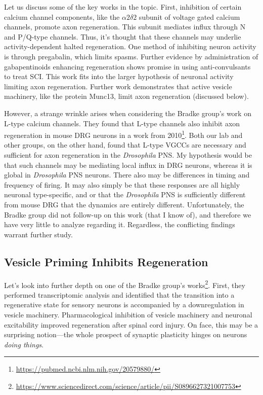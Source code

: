 Let us discuss some of the key works in the topic. First, inhibition of certain calcium channel components, like the $\alpha2\delta2$ subunit of voltage gated calcium channels, promote axon regeneration. This subunit mediates influx through N and P/Q-type channels. Thus, it's thought that these channels may underlie activity-dependent halted regeneration. One method of inhibiting neuron activity is through pregabalin, which limits spasms. Further evidence by administration of gabapentinoids enhancing regeneration shows promise in using anti-convulsants to treat SCI. This work fits into the larger hypothesis of neuronal activity limiting axon regeneration. Further work demonstrates that active vesicle machinery, like the protein Munc13, limit axon regeneration (discussed below).\newline

However, a strange wrinkle arises when considering the Bradke group's work on L-type calcium channels. They found that L-type channels also inhibit axon regeneration in mouse DRG neurons in a work from 2010\footnote{\url{https://pubmed.ncbi.nlm.nih.gov/20579880/}}. Both our lab and other groups, on the other hand, found that L-type VGCCs are necessary and sufficient for axon regeneration in the \textit{Drosophila} PNS. My hypothesis would be that such channels may be mediating local influx in DRG neurons, whereas it is global in \textit{Drosophila} PNS neurons. There also may be differences in timing and frequency of firing. It may also simply be that these responses are all highly neuronal type-specific, and or that the \textit{Drosophila} PNS is sufficiently different from mouse DRG that the dynamics are entirely different. Unfortunately, the Bradke group did not follow-up on this work (that I know of), and therefore we have very little to analyze regarding it. Regardless, the conflicting findings warrant further study.


\subsection{Vesicle Priming Inhibits Regeneration}

Let's look into further depth on one of the Bradke group's works\footnote{\url{https://www.sciencedirect.com/science/article/pii/S0896627321007753}}. First, they performed transcriptomic analysis and identified that the transition into a regenerative state for sensory neurons is accompanied by a downregulation in vesicle machinery. Pharmacological inhibition of vesicle machinery and neuronal excitability improved regeneration after spinal cord injury. On face, this may be a surprising notion---the whole prospect of synaptic plasticity hinges on neurons \textit{doing things}.\newline

